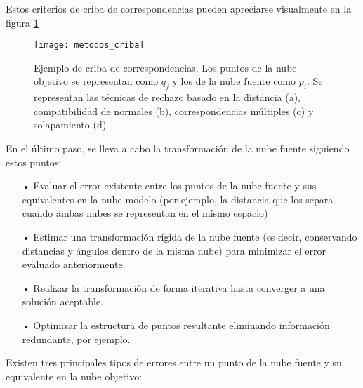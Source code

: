 Estos criterios de criba de correspondencias pueden apreciarse visualmente en la figura \ref{fig:metodos_criba}

\begin{figure}
\centering
\texttt{[image: metodos\_criba]}
\caption{Ejemplo de criba de correspondencias. Los puntos de la nube objetivo se representan como $q_j$ y los de la nube fuente como $p_i$. Se representan las técnicas de rechazo basado en la distancia (a), compatibilidad de normales (b), correspondencias múltiples (c) y solapamiento (d)}\label{fig:metodos_criba}
\end{figure}

En el último paso, se lleva a cabo la transformación de la nube fuente siguiendo estos puntos:

\begin{itemize}
\item[•]Evaluar el error existente entre los puntos de la nube fuente y sus equivalentes en la nube modelo (por ejemplo, la distancia que los separa cuando ambas nubes se representan en el mismo espacio)
\item[•]Estimar una transformación rígida de la nube fuente (es decir, conservando distancias y ángulos dentro de la misma nube) para minimizar el error evaluado anteriormente.
\item[•]Realizar la transformación de forma iterativa hasta converger a una solución aceptable.
\item[•]Optimizar la estructura de puntos resultante eliminando información redundante, por ejemplo.
\end{itemize}

Existen tres principales tipos de errores entre un punto de la nube fuente y su equivalente en la nube objetivo:

